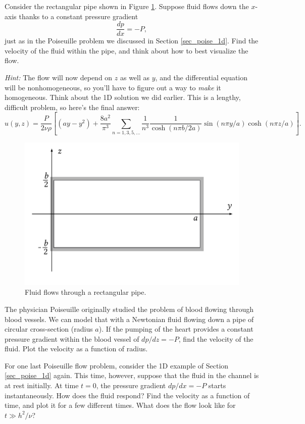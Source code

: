 \begin{problem}
\label{prob_poise_2d}
Consider the rectangular pipe shown in Figure \ref{fig_poise_2d_setup}.  Suppose fluid flows down the $x$-axis thanks to a constant pressure gradient 
\[
\frac{dp}{dx} = -P,
\]
just as in the Poiseuille problem we discussed in Section \ref{sec_poise_1d}.  Find the velocity of the fluid within the pipe, and think about how to best visualize the flow.  

\emph{Hint:} The flow will now depend on $z$ as well as $y$, and the differential equation will be nonhomogeneous, so you'll have to figure out a way to \emph{make} it homogeneous.  Think about the 1D solution we did earlier.  This is a lengthy, difficult problem, so here's the final answer:
\[
u(y, z) =  \frac{P}{2\nu \rho} \left[ (ay - y^2) + \frac{8a^2}{\pi^3} \sum_{n=1,3,5, \dots} \frac{1}{n^3} \frac{1}{\cosh (n\pi b / 2a)} \sin (n\pi y / a) \cosh(n \pi z / a) \right].
\]
\end{problem}

\begin{figure}
\centering
\includegraphics[width=0.7\linewidth]{Figures/Chapter2/fig_poise_2d_setup}
\caption{Fluid flows through a rectangular pipe.}
\label{fig_poise_2d_setup}
\end{figure}


\begin{problem}
\label{prob_poise_cyl}
The physician Poiseuille originally studied the problem of blood flowing through blood vessels. We can model that with a Newtonian fluid flowing down a pipe of circular cross-section (radius $a$).  If the pumping of the heart provides a constant pressure gradient within the blood vessel of $dp/dz = -P$,  find the velocity of the fluid.  Plot the velocity as a function of radius.
\end{problem}

\begin{problem}
\label{prob_poise_time}
For one last Poiseuille flow problem, consider the 1D example of Section \ref{sec_poise_1d} again.  This time, however, suppose that the fluid in the channel is at rest initially.  At time $t = 0$, the pressure gradient $dp/dx = -P$ starts instantaneously.  How does the fluid respond?  Find the velocity as a function of time, and plot it for a few different times.  What does the flow look like for $t \gg h^2 / \nu$?
\end{problem}

